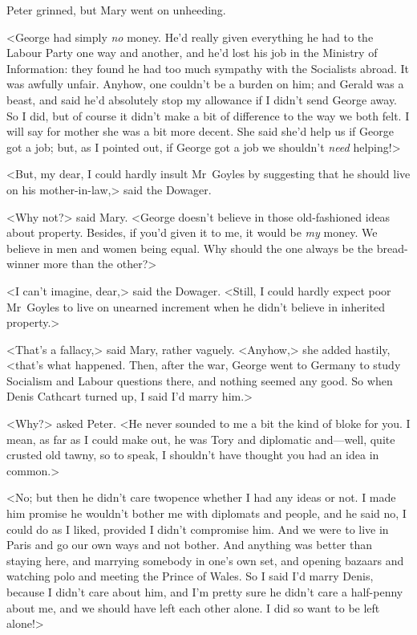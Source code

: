 Peter grinned, but Mary went on unheeding.

<George had simply \emph{no} money. He'd really given everything he had to the Labour Party one way and another, and he'd lost his job in the Ministry of Information: they found he had too much sympathy with the Socialists abroad. It was awfully unfair. Anyhow, one couldn't be a burden on him; and Gerald was a beast, and said he'd absolutely stop my allowance if I didn't send George away. So I did, but of course it didn't make a bit of difference to the way we both felt. I will say for mother she was a bit more decent. She said she'd help us if George got a job; but, as I pointed out, if George got a job we shouldn't \emph{need} helping!>

<But, my dear, I could hardly insult Mr~Goyles by suggesting that he should live on his mother-in-law,> said the Dowager.

<Why not?> said Mary. <George doesn't believe in those old-fashioned ideas about property. Besides, if you'd given it to me, it would be \emph{my} money. We believe in men and women being equal. Why should the one always be the bread-winner more than the other?>

<I can't imagine, dear,> said the Dowager. <Still, I could hardly expect poor Mr~Goyles to live on unearned increment when he didn't believe in inherited property.>

<That's a fallacy,> said Mary, rather vaguely. <Anyhow,> she added hastily, <that's what happened. Then, after the war, George went to Germany to study Socialism and Labour questions there, and nothing seemed any good. So when Denis Cathcart turned up, I said I'd marry him.>

<Why?> asked Peter. <He never sounded to me a bit the kind of bloke for you. I mean, as far as I could make out, he was Tory and diplomatic and—well, quite crusted old tawny, so to speak, I shouldn't have thought you had an idea in common.>

<No; but then he didn't care twopence whether I had any ideas or not. I made him promise he wouldn't bother me with diplomats and people, and he said no, I could do as I liked, provided I didn't compromise him.  And we were to live in Paris and go our own ways and not bother. And anything was better than staying here, and marrying somebody in one's own set, and opening bazaars and watching polo and meeting the Prince of Wales. So I said I'd marry Denis, because I didn't care about him, and I'm pretty sure he didn't care a half-penny about me, and we should have left each other alone. I did so want to be left alone!>

